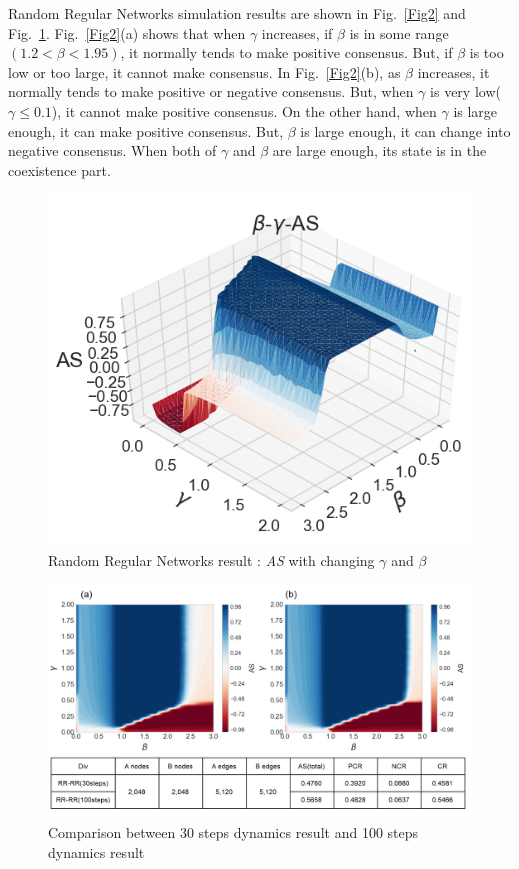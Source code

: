 \documentclass[english]{cccconf}
\begin{document}
Random Regular Networks simulation results are shown in Fig.~\ref{Fig2} and Fig.~\ref{Fig3}. Fig.~\ref{Fig2}(a) shows that when $\gamma$ increases, if $\beta$ is in some range$(1.2 < \beta < 1.95)$, it normally tends to make positive consensus. But, if $\beta$ is too low or too large, it cannot make consensus.
In Fig.~\ref{Fig2}(b), as $\beta$ increases, it normally tends to make positive or negative consensus. But, when $\gamma$ is very low($\gamma \le 0.1$), it cannot make positive consensus. On the other hand, when $\gamma$ is large enough, it can make positive consensus. But, $\beta$ is large enough, it can change into negative consensus. When both of $\gamma$ and $\beta$ are large enough, its state is in the coexistence part. 
\begin{figure}[!htb]
	\centering
	\includegraphics[width=\hsize]{FIG3.png}
	\caption{Random Regular  Networks result : \textit{AS} with changing $\gamma$ and $\beta$}
	\label{Fig3}
\end{figure}
\begin{figure}[!htb]
	\centering
	\includegraphics[width=\hsize]{FIG4.png}
	\caption{Comparison between 30 steps dynamics result and 100 steps dynamics result}
	\label{Fig4}
\end{figure}
\end{document}
